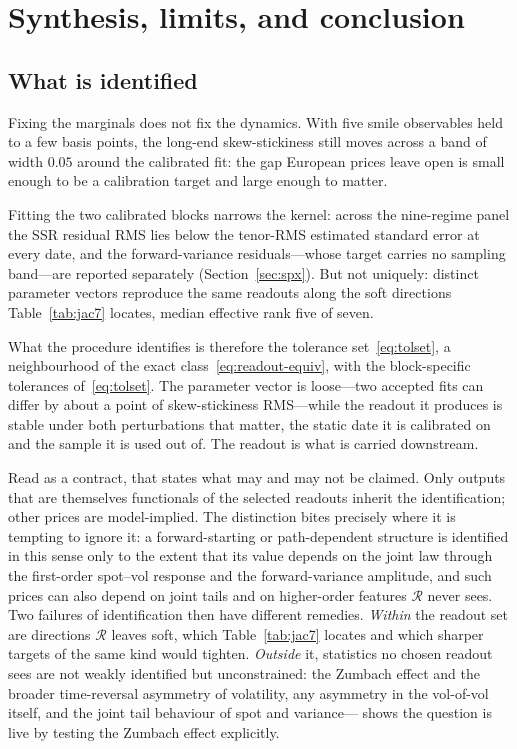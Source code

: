 \documentclass[11pt]{article}
\providecommand{\Rcal}{\mathcal R}
\providecommand{\1}{\mathbf 1}
\begin{document}
\section{Synthesis, limits, and conclusion}
\label{sec:discussion}

\subsection{What is identified}

Fixing the marginals does not fix the dynamics. With five smile observables held to a few basis
points, the long-end skew-stickiness still moves across a band of width $0.05$ around the calibrated
fit: the gap European prices leave open is small enough to be a calibration target and large enough
to matter.

Fitting the two calibrated blocks narrows the kernel: across the nine-regime panel the SSR residual
RMS lies below the tenor-RMS estimated standard error at every date, and the forward-variance
residuals---whose target carries no sampling band---are reported separately
(Section~\ref{sec:spx}). But not uniquely: distinct
parameter vectors reproduce the same readouts along the soft directions Table~\ref{tab:jac7}
locates, median effective rank five of seven.

What the procedure identifies is therefore the tolerance set~\eqref{eq:tolset}, a neighbourhood of
the exact class~\eqref{eq:readout-equiv}, with the block-specific tolerances
of~\eqref{eq:tolset}. The parameter vector is loose---two accepted fits can differ by about a point
of skew-stickiness RMS---while the readout it produces is stable under both perturbations that
matter, the static date it is calibrated on and the sample it is used out of. The readout is what is
carried downstream.

Read as a contract, that states what may and may not be claimed. Only outputs that are themselves
functionals of the selected readouts inherit the identification; other prices are model-implied.
The distinction bites precisely where it is tempting to ignore it: a forward-starting or
path-dependent structure is identified in this sense only to the extent that its value depends on
the joint law through the first-order spot--vol response and the forward-variance amplitude, and
such prices can also depend on joint tails and on higher-order features $\Rcal$ never sees. Two
failures of identification then have different remedies. \emph{Within} the readout set are
directions $\Rcal$ leaves soft, which Table~\ref{tab:jac7} locates and which sharper targets of the
same kind would tighten. \emph{Outside} it, statistics no chosen readout sees are not weakly
identified but unconstrained: the Zumbach effect and the broader time-reversal asymmetry of
volatility, any asymmetry in the vol-of-vol itself, and the joint tail behaviour of spot and
variance---\cite{abijaber2025} shows the question is live by testing the Zumbach effect
explicitly.
\end{document}
